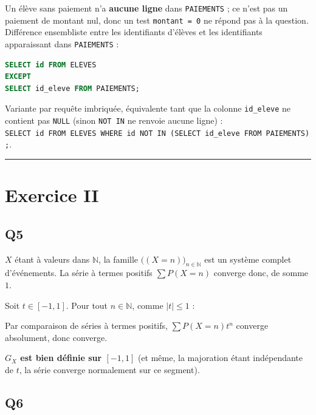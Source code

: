 \documentclass[11pt,a4paper]{article}
\newcommand{\equationajustee}[1]{%
  \sbox{\boiteequation}{$\displaystyle #1$}%
  \ifdim\wd\boiteequation>\linewidth
    \[\resizebox{\linewidth}{!}{\usebox{\boiteequation}}\]%
  \else
    \[#1\]%
  \fi}
\begin{document}
Un élève sans paiement n'a \textbf{aucune ligne} dans \texttt{PAIEMENTS} ; ce n'est pas un paiement de montant nul, donc un test \texttt{montant\ =\ 0} ne répond pas à la question. Différence ensembliste entre les identifiants d'élèves et les identifiants apparaissant dans \texttt{PAIEMENTS} :

\begin{lstlisting}[language=SQL]
SELECT id FROM ELEVES
EXCEPT
SELECT id_eleve FROM PAIEMENTS;
\end{lstlisting}

Variante par requête imbriquée, équivalente tant que la colonne \texttt{id\_eleve} ne contient pas \texttt{NULL} (sinon \texttt{NOT\ IN} ne renvoie aucune ligne) : \texttt{SELECT\ id\ FROM\ ELEVES\ WHERE\ id\ NOT\ IN\ (\allowbreak{}SELECT\ id\_eleve\ FROM\ PAIEMENTS)\allowbreak{};\allowbreak{}}.

\begin{center}\rule{0.5\linewidth}{0.5pt}\end{center}

\hypertarget{exercice-ii}{%
\section{Exercice II}\label{exercice-ii}}

\hypertarget{q5}{%
\subsection{Q5}\label{q5}}

\(X\) étant à valeurs dans \(\mathbb{N}\), la famille \(\big((X=n)\big)_{n\in\mathbb{N}}\) est un système complet d'événements. La série à termes positifs \(\sum P(X=n)\) converge donc, de somme \(1\).

Soit \(t\in[-1,1]\). Pour tout \(n\in\mathbb{N}\), comme \(|t|\le1\) :

\equationajustee{\begin{aligned}
|P(X=n)t^n|&=P(X=n)|t|^n\\
&\le P(X=n).
\end{aligned}}

Par comparaison de séries à termes positifs, \(\sum P(X=n)t^n\) converge absolument, donc converge.

\textbf{\(G_X\) est bien définie sur \([-1,1]\)} (et même, la majoration étant indépendante de \(t\), la série converge normalement sur ce segment).

\hypertarget{q6}{%
\subsection{Q6}\label{q6}}
\end{document}

